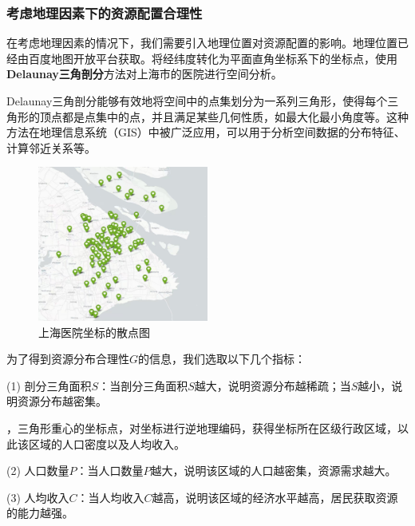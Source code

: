 \documentclass[12pt,a4paper]{article}
\begin{document}
\subsubsection{考虑地理因素下的资源配置合理性}

在考虑地理因素的情况下，我们需要引入地理位置对资源配置的影响。地理位置已经由百度地图开放平台获取。将经纬度转化为平面直角坐标系下的坐标点，使用\textbf{Delaunay三角剖分}方法对上海市的医院进行空间分析。

Delaunay三角剖分能够有效地将空间中的点集划分为一系列三角形，使得每个三角形的顶点都是点集中的点，并且满足某些几何性质，如最大化最小角度等。这种方法在地理信息系统（GIS）中被广泛应用，可以用于分析空间数据的分布特征、计算邻近关系等。

\begin{figure}[H] %
\centering %
\includegraphics[width=0.5\textwidth]{images/shanghai_hospital_location.jpg} %
\caption{上海医院坐标的散点图} %
\label{Fig.main2} %
\end{figure}

为了得到资源分布合理性$G$的信息，我们选取以下几个指标：

(1) 剖分三角面积$S$：当剖分三角面积$S$越大，说明资源分布越稀疏；当$S$越小，说明资源分布越密集。

，三角形重心的坐标点，对坐标进行逆地理编码，获得坐标所在区级行政区域，以此该区域的人口密度以及人均收入。
\normalfont

(2) 人口数量$P$：当人口数量$P$越大，说明该区域的人口越密集，资源需求越大。

(3) 人均收入$C$：当人均收入$C$越高，说明该区域的经济水平越高，居民获取资源的能力越强。
\end{document}
